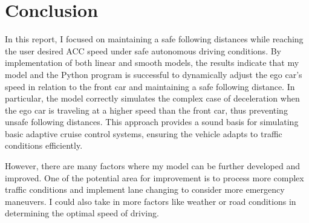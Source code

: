 \documentclass[12pt]{article}
\begin{document}
\section*{Conclusion}
In this report, I focused on maintaining a safe following distances while reaching the user desired ACC speed under safe autonomous driving conditions. By implementation of both linear and smooth models, the results indicate that my model and the Python program is successful to dynamically adjust the ego car's speed in relation to the front car and maintaining a safe following distance. In particular, the model correctly simulates the complex case of deceleration when the ego car is traveling at a higher speed than the front car, thus preventing unsafe following distances. This approach provides a sound basis for simulating basic adaptive cruise control systems, ensuring the vehicle adapts to traffic conditions efficiently.

However, there are many factors where my model can be further developed and improved. One of the potential area for improvement is to process more complex traffic conditions and implement lane changing to consider more emergency maneuvers. I could also take in more factors like weather or road conditions in determining the optimal speed of driving. 


\printbibliography
\end{document}
